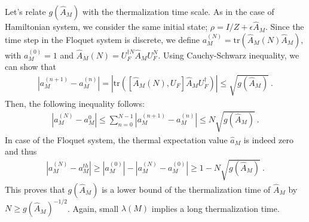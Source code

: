 \documentclass[twocolumn,superscriptaddress, prl,showpacs]{revtex4-1}
\begin{document}
Let's relate $g(\hat{A}_M) $ with the thermalization time scale.
As in the case of Hamiltonian system, we consider the same initial state; $\rho = I/Z + \epsilon \hat{A}_M$. %
Since the time step in the Floquet system is discrete, we define $a_M^{(N)} = \mathrm{tr}(\hat{A}_M(N)\hat{A}_M )$, with
$a_M^{(0)} = 1$ and $\hat{A}_M(N) = U_F^{\dag N}\hat{A}_M U_F^N$. Using Cauchy-Schwarz inequality, we can show that
\begin{align}
|a_M^{(n+1)} - a_M^{(n)}| = |\mathrm{tr}([\hat{A}_M(N),U_F]\hat{A}_M U_F^{\dag})| \leq \sqrt{g(\hat{A}_M) } ~.
\end{align}
Then, the following inequality follows:
\begin{align}
|a_M^{(N)} - a_M^{0}| %
\leq \sum_{n = 0}^{N-1}|a_M^{(n+1)} - a_M^{(n)}| \leq N \sqrt{g(\hat{A}_M) } ~.
\end{align}
In case of the Floquet system, the thermal expectation value $\hat{a}_M$ is indeed zero and thus
\begin{align}
|a_M^{(N)} - a_M^{th}| \geq |a_M^{(0)}| - |a_M^{(N)} - a_M^{(0)}| \geq 1 - N \sqrt{g(\hat{A}_M) } ~.
\label{eq:floquet_timescale}
\end{align}
This proves that $g(\hat{A}_M)$ is a lower bound of the thermalization time of $\hat{A}_M$ by
$N \geq g(\hat{A}_M) ^{-1/2}$. Again, small $\lambda(M)$ implies a long thermalization time.
\end{document}
